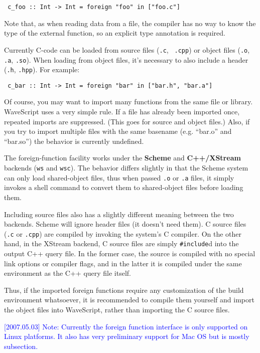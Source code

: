 \documentclass[twocolumn]{report}
\newcommand{\rednote}[1]{{\textcolor{blue}{#1}}}
\newenvironment{wscode}{\begin{center}\tt}{\end{center}}
\begin{document}
\begin{wscode}
c\_foo :: Int -> Int = foreign "foo" in ["foo.c"]
\end{wscode}

Note that, as when reading data from a file, the compiler has no way
to know the type of the external function, so an explicit type
annotation is required.

Currently C-code can be loaded from source files ({\tt .c}, {\tt
  .cpp}) or object files ({\tt .o}, {\tt .a}, {\tt .so}).  When
  loading from object files, it's necessary to also include a header
  ({\tt .h}, {\tt .hpp}).  For example:

\begin{wscode}
c\_bar :: Int -> Int = foreign "bar" in ["bar.h", "bar.a"]
\end{wscode}

Of course, you may want to import many functions from the same file or
library.  WaveScript uses a very simple rule.  If a file has already
been imported once, repeated imports are suppressed.  (This goes for
source and object files.)  Also, if you try to import multiple files with
the same basename (e.g. ``bar.o'' and ``bar.so'') the behavior is
currently undefined.

The foreign-function facility works under the {\bf Scheme} and {\bf
 C++/XStream} backends ({\tt ws} and {\tt wsc}).  The behavior differs
 slightly in that the Scheme system can only load shared-object files,
 thus when passed {\tt .o} or {\tt .a} files, it simply invokes a
 shell command to convert them to shared-object files before loading
 them.

Including source files also has a slightly different meaning between
the two backends.  Scheme will ignore header files (it doesn't need
them).  C source files ({\tt .c} or {\tt .cpp}) are compiled by
invoking the system's C compiler.  On the other hand, in the XStream backend, C source
files are simply {\tt \#include}d into the output C++ query file.  In
the former case, the source is compiled with no special link options
or compiler flags, and in the latter it is compiled under the same
environment as the C++ query file itself.

Thus, if the imported foreign functions require any customization of
the build environment whatsoever, it is recommended to compile them
yourself and import the object files into WaveScript, rather than
importing the C source files.

\rednote{[2007.05.03] Note: Currently the foreign function interface is only
supported on Linux platforms.  It also has very preliminary support
for Mac OS but is mostly subsection.}
\end{document}
